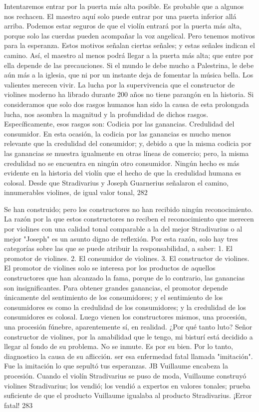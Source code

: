 Intentaremos entrar por la puerta más alta posible. Es probable que a algunos nos rechacen. El maestro aquí solo puede entrar por una puerta inferior allá arriba. Podemos estar seguros de que el violín entrará por la puerta más alta, porque solo las cuerdas pueden acompañar la voz angelical. Pero tenemos motivos para la esperanza. Estos motivos señalan ciertas señales; y estas señales indican el camino. Así, el maestro al menos podrá llegar a la puerta más alta; que entre por ella depende de las precauciones.
Si el mundo le debe mucho a Palestrina, le debe aún más a la iglesia, que ni por un instante deja de fomentar la música bella.
Los valientes merecen vivir.
La lucha por la supervivencia que el constructor de violines moderno ha librado durante 200 años no tiene parangón en la historia. Si consideramos que solo dos rasgos humanos han sido la causa de esta prolongada lucha, nos asombra la magnitud y la profundidad de dichos rasgos. Específicamente, esos rasgos son:
Codicia por las ganancias.
Credulidad del consumidor.
En esta ocasión, la codicia por las ganancias es mucho menos relevante que la credulidad del consumidor; y, debido a que la misma codicia por las ganancias se muestra igualmente en otras líneas de comercio; pero, la misma credulidad no se encuentra en ningún otro consumidor. Ningún hecho es más evidente en la historia del violín que el hecho de que la credulidad humana es colosal. Desde que Stradivarius y Joseph Guarnerius señalaron el camino, innumerables violines, de igual valor tonal,
282

Se han construido; pero los constructores no han recibido ningún reconocimiento.
La razón por la que estos constructores no reciben el reconocimiento que merecen por violines con una calidad tonal comparable a la del mejor Stradivarius o al mejor "Joseph" es un asunto digno de reflexión. Por esta razón, solo hay tres categorías sobre las que se puede atribuir la responsabilidad, a saber:
1. El promotor de violines. 2. El consumidor de violines. 3. El constructor de violines.
El promotor de violines solo se interesa por los productos de aquellos constructores que han alcanzado la fama, porque de lo contrario, las ganancias son insignificantes. Para obtener grandes ganancias, el promotor depende únicamente del sentimiento de los consumidores; y el sentimiento de los consumidores es como la credulidad de los consumidores; y la credulidad de los consumidores es colosal. Luego vienen los constructores mismos, una procesión, una procesión fúnebre, aparentemente sí, en realidad.
¿Por qué tanto luto?
Señor constructor de violines, por la amabilidad que le tengo, mi bisturí está decidido a llegar al fondo de su problema. No se inmute. Es por su bien. Por lo tanto, diagnostico la causa de su aflicción.
ser esa enfermedad fatal llamada "imitación".
Fue la imitación lo que sepultó tus esperanzas.
JB Vuillaume encabeza la procesión. Cuando el violín Stradivarius se puso de moda, Vuillaume construyó violines Stradivarius; los vendió; los vendió a expertos en valores tonales; prueba suficiente de que el producto Vuillaume igualaba al producto Stradivarius.
¡Error fatal! 283

